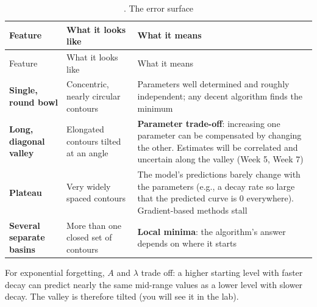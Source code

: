 \begin{longtable}[]{@{}
  >{\raggedright\arraybackslash}p{}
  >{\raggedright\arraybackslash}p{}
  >{\raggedright\arraybackslash}p{}@{}}
\caption{. The error surface}\tabularnewline
\toprule\noalign{}
\begin{minipage}[b]{\linewidth}\raggedright
Feature
\end{minipage} & \begin{minipage}[b]{\linewidth}\raggedright
What it looks like
\end{minipage} & \begin{minipage}[b]{\linewidth}\raggedright
What it means
\end{minipage} \\
\midrule\noalign{}
\endfirsthead
\toprule\noalign{}
\begin{minipage}[b]{\linewidth}\raggedright
Feature
\end{minipage} & \begin{minipage}[b]{\linewidth}\raggedright
What it looks like
\end{minipage} & \begin{minipage}[b]{\linewidth}\raggedright
What it means
\end{minipage} \\
\midrule\noalign{}
\endhead
\bottomrule\noalign{}
\endlastfoot
\textbf{Single, round bowl} & Concentric, nearly circular contours &
Parameters well determined and roughly independent; any decent algorithm
finds the minimum \\
\textbf{Long, diagonal valley} & Elongated contours tilted at an angle &
\textbf{Parameter trade-off}: increasing one parameter can be
compensated by changing the other. Estimates will be correlated and
uncertain along the valley (Week 5, Week 7) \\
\textbf{Plateau} & Very widely spaced contours & The model's predictions
barely change with the parameters (e.g., a decay rate so large that the
predicted curve is 0 everywhere). Gradient-based methods stall \\
\textbf{Several separate basins} & More than one closed set of contours
& \textbf{Local minima}: the algorithm's answer depends on where it
starts \\
\end{longtable}

For exponential forgetting, \(A\) and \(\lambda\) trade off: a higher
starting level with faster decay can predict nearly the same mid-range
values as a lower level with slower decay. The valley is therefore
tilted (you will see it in the lab).

